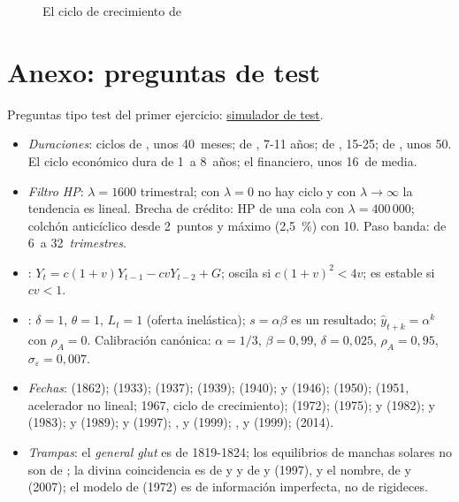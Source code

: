 \documentclass[11pt]{article}
\begin{document}
\begin{figure}[H]
\centering
\caption{El ciclo de crecimiento de }\label{fig:goodwin}
\end{figure}

\section{Anexo: preguntas de test}\label{anexo:test}

\begin{anotaciones}
Preguntas tipo test del primer ejercicio: \href{https://www.victorgutierrezmarcos.es/oposicion/temario/primer-ejercicio/test/simulador.html?tema=3.A.42}{simulador de test}.
\end{anotaciones}

\begin{itemize}
\item \emph{Duraciones}: ciclos de , unos 40~meses; de , 7-11 años; de , 15-25; de , unos 50. El ciclo económico dura de 1~a 8~años; el financiero, unos 16~de media.
\item \emph{Filtro HP}: $\lambda=1600$ trimestral; con $\lambda=0$ no hay ciclo y con $\lambda\to\infty$ la tendencia es lineal. Brecha de crédito: HP de una cola con $\lambda=400\,000$; colchón anticíclico desde 2~puntos y máximo (2,5~\%) con 10. Paso banda: de 6~a 32~\emph{trimestres}.
\item \emph{}: $Y_t=c(1+v)Y_{t-1}-cvY_{t-2}+G$; oscila si $c(1+v)^2<4v$; es estable si $cv<1$.
\item \emph{}: $\delta=1$, $\theta=1$, $L_t=1$ (oferta inelástica); $s=\alpha\beta$ es un resultado; $\hat y_{t+k}=\alpha^k$ con $\rho_A=0$. Calibración canónica: $\alpha=1/3$, $\beta=0{,}99$, $\delta=0{,}025$, $\rho_A=0{,}95$, $\sigma_\varepsilon=0{,}007$.
\item \emph{Fechas}:  (1862);  (1933);  (1937);  (1939);  (1940);  y  (1946);  (1950);  (1951, acelerador no lineal; 1967, ciclo de crecimiento);  (1972);  (1975);  y  (1982);  y  (1983);  y  (1989);  y  (1997); ,  y  (1999); ,  y  (1999);  (2014).
\item \emph{Trampas}: el \emph{general glut} es de 1819-1824; los equilibrios de manchas solares no son de ; la divina coincidencia es de  y  y de  y  (1997), y el nombre, de  y  (2007); el modelo de  (1972) es de información imperfecta, no de rigideces.
\end{itemize}

\bibliografia
\end{document}
